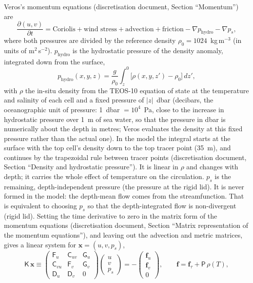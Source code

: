 \documentclass{article}
\begin{document}
Veros's momentum equations (discretisation document, Section ``Momentum'') are
\[
\frac{\partial (u,v)}{\partial t} = \text{Coriolis} + \text{wind stress} + \text{advection} + \text{friction} - \nabla p_\text{hydro} - \nabla p_s ,
\]
where both pressures are divided by the reference density $\rho_0 = 1024$~kg\,m$^{-3}$ (in units of m$^2$\,s$^{-2}$).
$p_\text{hydro}$ is the hydrostatic pressure of the density anomaly, integrated down from the surface,
\[
p_\text{hydro}(x,y,z) = \frac{g}{\rho_0}\int_z^0 \big[\rho(x,y,z') - \rho_0\big]\,dz',
\]
with $\rho$ the in-situ density from the TEOS-10 equation of state at the temperature and salinity of each cell and a fixed pressure of $|z|$~dbar (decibars, the oceanographic unit of pressure: 1~dbar $=10^4$~Pa, close to the increase in hydrostatic pressure over 1~m of sea water, so that the pressure in dbar is numerically about the depth in metres; Veros evaluates the density at this fixed pressure rather than the actual one). In the model the integral starts at the surface with the top cell's density down to the top tracer point (35~m), and continues by the trapezoidal rule between tracer points (discretisation document, Section ``Density and hydrostatic pressure''). It is linear in $\rho$ and changes with depth; it carries the whole effect of temperature on the circulation.
$p_s$ is the remaining, depth-independent pressure (the pressure at the rigid lid). It is never formed in the model: the depth-mean flow comes from the streamfunction. That is equivalent to choosing $p_s$ so that the depth-integrated flow is non-divergent (rigid lid). Setting the time derivative to zero in the matrix form of the momentum equations (discretisation document, Section ``Matrix representation of the momentum equations''), and leaving out the advection and metric matrices, gives a linear system for $\mathbf{x} = (u, v, p_s)$,
\begin{equation}
\mathsf{K}\,\mathbf{x} \equiv
\begin{pmatrix}
\mathsf{F}_u & \mathsf{C}_{uv} & \mathsf{G}_u \\
\mathsf{C}_{vu} & \mathsf{F}_v & \mathsf{G}_v \\
\mathsf{D}_u & \mathsf{D}_v & 0
\end{pmatrix}
\begin{pmatrix} u \\ v \\ p_s \end{pmatrix}
= -\begin{pmatrix} \mathbf{f}_u \\ \mathbf{f}_v \\ 0 \end{pmatrix},
\qquad
\mathbf{f} = \mathbf{f}_\tau + \mathsf{P}\,\rho(T),
\label{eq:K}
\end{equation}
\end{document}
